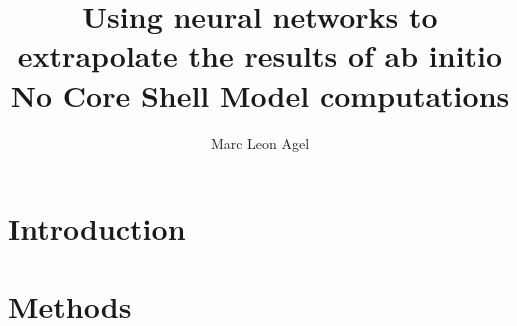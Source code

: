 






\title{Using neural networks to extrapolate the results of
  ab initio No Core Shell Model computations}
\author{Marc Leon Agel}
\reviewer{ }


\submissiondate{\today}
\examdate{\today}

\maketitle

\affidavit

\tableofcontents

\chapter{Introduction}


\chapter{Methods}


\printbibliography

